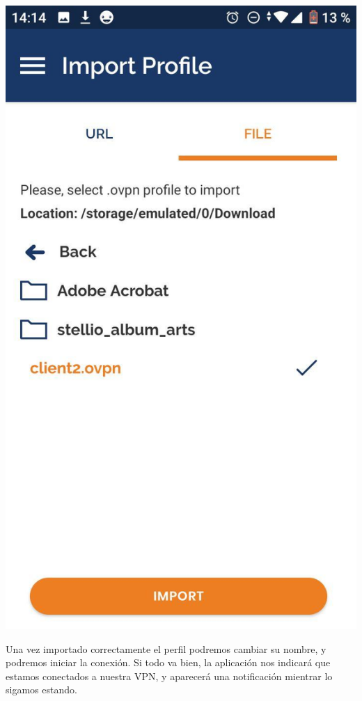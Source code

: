 \documentclass[11pt,a4paper]{article}
\begin{document}
\medskip

\begin{center}
\includegraphics[scale=0.4]{import-profile.jpg}
\end{center}

\medskip

Una vez importado correctamente el perfil podremos cambiar su nombre, y podremos iniciar la conexión. Si todo va bien, la aplicación nos indicará que estamos conectados a nuestra VPN, y aparecerá una notificación mientrar lo sigamos estando.
\end{document}
